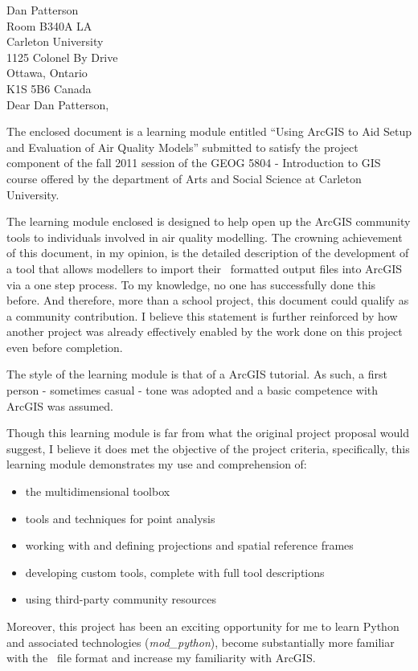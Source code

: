 
\pagestyle{empty}

\noindent Dan Patterson\\
Room B340A LA\\
Carleton University\\
1125 Colonel By Drive\\
Ottawa, Ontario\\
K1S 5B6 Canada\\


\vspace{5mm}
\noindent Dear Dan Patterson,
\vspace{5mm}

The enclosed document is a learning module entitled ``Using ArcGIS to
Aid Setup and Evaluation of Air Quality Models'' submitted to
satisfy the project component of the fall 2011 session of the GEOG
5804 - Introduction to GIS course offered by the department of Arts
and Social Science at Carleton University.

The learning module enclosed is designed to help open up the ArcGIS
community tools to individuals involved in air quality modelling.  The
crowning achievement of this document, in my opinion, is the detailed
description of the development of a tool that allows modellers to
import their \ioapi~formatted output files into ArcGIS via a one step
process.  To my knowledge, no one has successfully done this before.
And therefore, more than a school project, this document could qualify
as a community contribution.  I believe this statement is further reinforced
by how another project was already effectively enabled by the work done on
this project even before completion.

The style of the learning module is that of a ArcGIS tutorial.  As such, a
first person - sometimes casual - tone was adopted and a basic
competence with ArcGIS was assumed.

Though this learning module is far from what the original project
proposal would suggest, I believe it does met the objective of the
project criteria, specifically, this learning module demonstrates my
use and comprehension of:
\begin{itemize}
	\item the multidimensional toolbox
	\item tools and techniques for point analysis
	\item working with and defining projections and spatial reference frames
	\item developing custom tools, complete with full tool descriptions
	\item using third-party community resources
\end{itemize}
Moreover, this project has been an exciting opportunity for me to
learn Python and associated technologies (\emph{mod\_python}), become
substantially more familiar with the \netcdf~file format and
increase my familiarity with ArcGIS.

